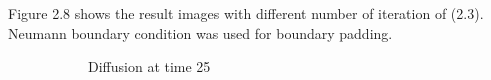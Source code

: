 \documentclass[paper=a4, fontsize=11pt]{scrartcl} %
\numberwithin{equation}{section} %
\numberwithin{figure}{section} %
\numberwithin{table}{section} %
\begin{document}
Figure 2.8 shows the result images with different number of iteration of (2.3). Neumann boundary condition was used for boundary padding.

\begin{figure}[H]
	\caption{Denoised image after diffusion\label{fig:simple}}
	\centering
	\begin{subfigure}[b]{0.45\textwidth}
		\noindent{}
	\caption{Diffusion at time 25}
	\end{subfigure}
	\hspace{5mm}
	\vspace{5mm}
	\begin{subfigure}[b]{0.45\textwidth}
		\noindent{}
\end{subfigure}
\end{figure}
\end{document}
